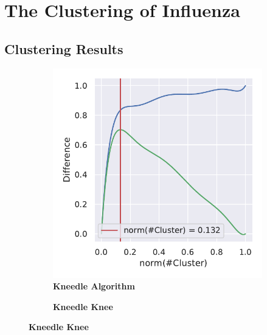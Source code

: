 \section{The Clustering of Influenza} \label{sec:Clustering}

\blindtext

\subsection{Clustering Results}

\begin{figure}
    \centering
    \begin{subfigure}[b]{0.475\textwidth}
        \caption[Kneedle Algorithm]{\textbf{Kneedle Algorithm}}
        \label{subfig:PCA_Cluster_Knee_Kneedle_4}            \includegraphics[width=\textwidth]{PCA/Cluster_Knee_Segment_4.pdf}
    \end{subfigure}
    \hfill
    \begin{subfigure}[b]{0.475\textwidth}
        \caption[Kneedle Knee]{\textbf{Kneedle Knee}}

\end{subfigure}
\end{figure}
